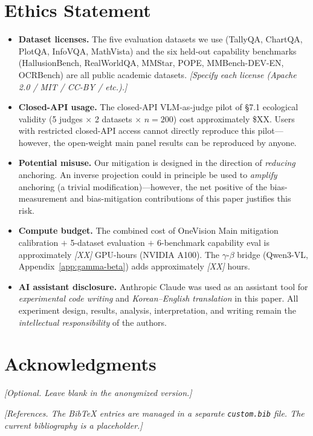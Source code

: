 \documentclass[11pt]{article}
\newcommand{\todoNote}[1]{\textit{\textcolor[rgb]{0.45,0.45,0.45}{[#1]}}}
\begin{document}
\section*{Ethics Statement}
\begin{itemize}
  \item \textbf{Dataset licenses.}
    The five evaluation datasets we use (TallyQA, ChartQA, PlotQA, InfoVQA, MathVista) and the six held-out capability benchmarks (HallusionBench, RealWorldQA, MMStar, POPE, MMBench-DEV-EN, OCRBench) are all public academic datasets. \todoNote{Specify each license (Apache 2.0 / MIT / CC-BY / etc.).}
  \item \textbf{Closed-API usage.}
    The closed-API VLM-as-judge pilot of \S7.1 ecological validity (5 judges $\times$ 2 datasets $\times$ $n=200$) cost approximately \$XX. Users with restricted closed-API access cannot directly reproduce this pilot---however, the open-weight main panel results can be reproduced by anyone.
  \item \textbf{Potential misuse.}
    Our mitigation is designed in the direction of \textit{reducing} anchoring. An inverse projection could in principle be used to \textit{amplify} anchoring (a trivial modification)---however, the net positive of the bias-measurement and bias-mitigation contributions of this paper justifies this risk.
  \item \textbf{Compute budget.}
    The combined cost of OneVision Main mitigation calibration $+$ 5-dataset evaluation $+$ 6-benchmark capability eval is approximately \todoNote{XX} GPU-hours (NVIDIA A100). The $\gamma$-$\beta$ bridge (Qwen3-VL, Appendix~\ref{app:gamma-beta}) adds approximately \todoNote{XX} hours.
  \item \textbf{AI assistant disclosure.}
    Anthropic Claude was used as an assistant tool for \textit{experimental code writing} and \textit{Korean--English translation} in this paper. All experiment design, results, analysis, interpretation, and writing remain the \textit{intellectual responsibility} of the authors.
\end{itemize}

\section*{Acknowledgments}
\todoNote{Optional. Leave blank in the anonymized version.}

% 
\todoNote{References. The BibTeX entries are managed in a separate \texttt{custom.bib} file. The current bibliography is a placeholder.}
\end{document}
